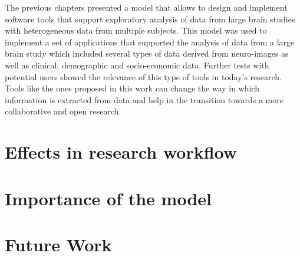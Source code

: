 The previous chapters presented a model that allows to design and implement software tools that support exploratory analysis of data from large brain studies with heterogeneous data from multiple subjects. This model was used to implement a set of applications that supported the analysis of data from a large brain study which included several types of data derived from neuro-images as well as clinical, demographic and socio-economic data. Further tests with potential users showed the relevance of this type of tools in today's research. Tools like the ones proposed in this work can change the way in which information is extracted from data and help in the transition towards a more collaborative and open research. 

\section{Effects in research workflow}






\section{Importance of the model}


%


\section{Future Work}




